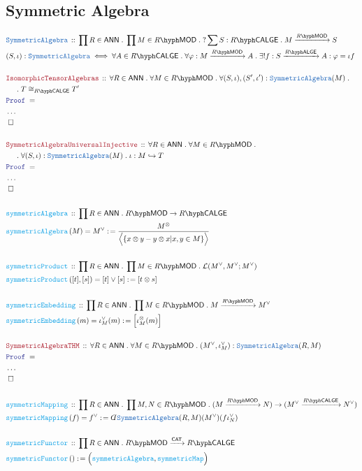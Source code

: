 \documentclass[12pt]{scrartcl}%
\newcommand{\TYPE}[1]{\textcolor{NavyBlue}{\mathtt{#1}}}%
\newcommand{\FUNC}[1]{\textcolor{Cerulean}{\mathtt{#1}}}%
\newcommand{\LOGIC}[1]{\textcolor{Blue}{\mathtt{#1}}}%
\newcommand{\THM}[1]{\textcolor{Maroon}{\mathtt{#1}}}%
\renewcommand{\.}{\; . \;} %
\newcommand{\de}{: \kern 0.1pc =} %
\newcommand{\Act}[1]{\left( #1 \right)} %
\newcommand{\Theorem}[2]{& \THM{#1} \, :: \, #2 \\ & \Proof = \\ } %
\newcommand{\DeclareType}[2]{& \TYPE{#1} \, :: \, #2 \\}%
\newcommand{\DefineType}[3]{& #1 : \TYPE{#2} \iff #3 \\}%
\newcommand{\DeclareFunc}[2]{& \FUNC{#1} \, :: \, #2 \\}%
\newcommand{\DefineFunc}[3]{&  \FUNC{#1}\Act{#2} \de #3 \\}%
\newcommand{\DefineNamedFunc}[4]{&  \FUNC{#1}\Act{#2} = #3 \de #4 \\}%
\newcommand{\NewLine}{\\ & \kern 1pc}%
\newcommand{\Page}[1]{ \begin{align*} #1 \end{align*}  }%
\newcommand{ \bd }{ \ByDef }%
\newcommand{\NoProof}{ & \ldots \\ \EndProof}%
\newcommand{\ToInj}{\hookrightarrow} %
\newcommand{\QED}{\; \square} %
\newcommand{\EndProof}{& \QED \\} %
\newcommand{\ByDef}{\rotatebox[origin=c]{-180}{$D$}}%
\newcommand{\Proof}{\LOGIC{Proof} \; } %
\newcommand{\Arrow}[1]{\xrightarrow{#1}}%
\newcommand{\CAT}{\mathsf{CAT}} %
\newcommand{\LMOD}[1]{#1\hyph\mathsf{MOD}} %
\renewcommand{\L}{\mathcal{L}}
\newcommand{\ANN}{\mathsf{ANN}} %
\newcommand{\LALGE}[1]{#1\hyph\mathsf{ALGE}}%
\newcommand{\LCALGE}[1]{#1\hyph\mathsf{CALGE}}%
\begin{document}
\subsection{Symmetric Algebra}
\Page{
	\DeclareType{SymmetricAlgebra}{\prod R \in \ANN \. \prod M \in \LMOD{R} \. ? \sum S : \LCALGE{R} \. M \Arrow{\LMOD{R}} S }
	\DefineType{(S,\iota)}{SymmetricAlgebra}{ \forall A \in \LCALGE{R} \. \forall \varphi : M \Arrow{\LMOD{R}} A \. \exists! f : S \Arrow{\LALGE{R}} A : \varphi = \iota f  }
	\\
	\Theorem{IsomorphicTensorAlgebras}{\forall R \in \ANN \. \forall M \in \LMOD{R} \.  \forall (S,\iota),(S',\iota') : \TYPE{SymmetricAlgebra}(M) \. 
		\NewLine \. T \cong_{\LCALGE{R}} T'}
	\NoProof
	\\
	\Theorem{SymmetricAlgebraUniversalInjective}{\forall R \in \ANN \. \forall M \in \LMOD{R} \. \NewLine \. \forall (S,\iota) : \TYPE{SymmetricAlgebra}(M) \. \iota : M \ToInj T }
	\NoProof
	\\
	\DeclareFunc{symmetricAlgebra}{ \prod R \in \ANN \. \LMOD{R} \to \LCALGE{R}  }
	\DefineNamedFunc{symmetricAlgebra}{M}{M^{\vee}}{\frac{M^\otimes}{\Big\langle \{ x \otimes y - y \otimes x | x,y \in M  \}  \Big\rangle }  }
	\\
	\DeclareFunc{symmetricProduct}{ \prod R \in \ANN \. \prod M \in \LMOD{R} \. \L( M^\vee,M^\vee;M^\vee)  }
	\DefineNamedFunc{symmetricProduct}{ [t],[s]  }{ [t] \vee [s]}{  [ t \otimes s ] }
	\\
	\DeclareFunc{symmetricEmbedding}{ \prod R \in \ANN \. \prod M \in \LMOD{R} \. M \Arrow{\LMOD{R}} M^\vee  }
	\DefineNamedFunc{symmetricEmbedding}{ m  }{ \iota^\vee_M(m)}{ \Big[\iota^\otimes_M(m)\Big]   }
	\\
	\Theorem{SymmetricAlgebraTHM}
	{
		\forall R \in \ANN \. \forall M \in \LMOD{R} \. 
		(M^\vee,\iota^\vee_M) : \TYPE{SymmetricAlgebra}(R,M)
	}
	\NoProof
	\\
	\DeclareFunc{symmetricMapping}{\prod R \in \ANN \. \prod M,N \in \LMOD{R} \. ( M \Arrow{\LMOD{R}} N) \to (M^\vee \Arrow{\LCALGE{R}} N^\vee) } 
	\DefineNamedFunc{symmetricMapping}{f }{f^\vee }{ \bd \TYPE{SymmetricAlgebra}(R,M)(M^\vee)( f \iota^\vee_N)}
	\\
	\DeclareFunc{symmetricFunctor}{ \prod R \in \ANN \. \LMOD{R} \Arrow{\CAT} \LCALGE{R} }
	\DefineFunc{symmetricFunctor}{ }{\Big(\FUNC{symmetricAlgebra},\FUNC{symmetricMap}\Big)}
}
\end{document}
